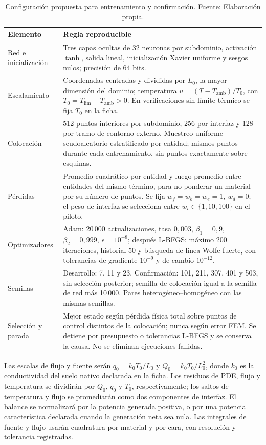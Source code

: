 \begin{table}[htbp]
\centering
\caption{Configuración propuesta para entrenamiento y confirmación. Fuente: Elaboración propia.}
\label{tab:protocolo-pinn}
\begin{tabularx}{\textwidth}{L{3.4cm}Y}
\toprule
\textbf{Elemento} & \textbf{Regla reproducible} \\
\midrule
Red e inicialización & Tres capas ocultas de 32 neuronas por subdominio, activación $\tanh$, salida lineal, inicialización Xavier uniforme y sesgos nulos; precisión de 64 bits. \\
Escalamiento & Coordenadas centradas y divididas por $L_0$, la mayor dimensión del dominio; temperatura $u=(T-T_{\mathrm{amb}})/T_0$, con $T_0=T_{\mathrm{lim}}-T_{\mathrm{amb}}>0$. En verificaciones sin límite térmico se fija $T_0$ en la ficha. \\
Colocación & 512 puntos interiores por subdominio, 256 por interfaz y 128 por tramo de contorno externo. Muestreo uniforme seudoaleatorio estratificado por entidad; mismos puntos durante cada entrenamiento, sin puntos exactamente sobre esquinas. \\
Pérdidas & Promedio cuadrático por entidad y luego promedio entre entidades del mismo término, para no ponderar un material por su número de puntos. Se fija $w_f=w_b=w_e=1$, $w_d=0$; el peso de interfaz se selecciona entre $w_i\in\{1,10,100\}$ en el piloto. \\
Optimizadores & Adam: 20\,000 actualizaciones, tasa $0{,}003$, $\beta_1=0{,}9$, $\beta_2=0{,}999$, $\epsilon=10^{-8}$; después L-BFGS: máximo 200 iteraciones, historial 50 y búsqueda de línea Wolfe fuerte, con tolerancias de gradiente $10^{-9}$ y de cambio $10^{-12}$. \\
Semillas & Desarrollo: 7, 11 y 23. Confirmación: 101, 211, 307, 401 y 503, sin selección posterior; semilla de colocación igual a la semilla de red más 10\,000. Pares heterogéneo--homogéneo con las mismas semillas. \\
Selección y parada & Mejor estado según pérdida física total sobre puntos de control distintos de la colocación; nunca según error FEM. Se detiene por presupuesto o tolerancias L-BFGS y se conserva la causa. No se eliminan ejecuciones fallidas. \\
\bottomrule
\end{tabularx}
\end{table}

Las escalas de flujo y fuente serán $q_0=k_0T_0/L_0$ y $Q_0=k_0T_0/L_0^2$, donde $k_0$ es la conductividad del suelo nativo declarada en la ficha. Los residuos de PDE, flujo y temperatura se dividirán por $Q_0$, $q_0$ y $T_0$, respectivamente; los saltos de temperatura y flujo se promediarán como dos componentes de interfaz. El balance se normalizará por la potencia generada positiva, o por una potencia característica declarada cuando la generación neta sea nula. Las integrales de fuente y flujo usarán cuadratura por material y por cara, con resolución y tolerancia registradas.


